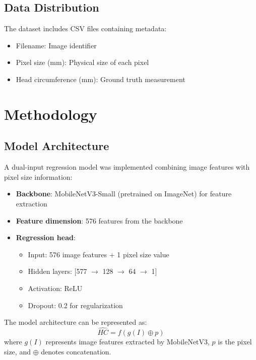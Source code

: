 \documentclass{article}
\begin{document}
\subsection{Data Distribution}
The dataset includes CSV files containing metadata:
\begin{itemize}
    \item Filename: Image identifier
    \item Pixel size (mm): Physical size of each pixel
    \item Head circumference (mm): Ground truth measurement
\end{itemize}

\section{Methodology}
\subsection{Model Architecture}
A dual-input regression model was implemented combining image features with pixel size information:

\begin{itemize}
    \item \textbf{Backbone}: MobileNetV3-Small (pretrained on ImageNet) for feature extraction
    \item \textbf{Feature dimension}: 576 features from the backbone
    \item \textbf{Regression head}: 
    \begin{itemize}
        \item Input: 576 image features + 1 pixel size value
        \item Hidden layers: [577 $\rightarrow$ 128 $\rightarrow$ 64 $\rightarrow$ 1]
        \item Activation: ReLU
        \item Dropout: 0.2 for regularization
    \end{itemize}
\end{itemize}

The model architecture can be represented as:
\begin{equation}
    \hat{HC} = f(g(I) \oplus p)
\end{equation}
where $g(I)$ represents image features extracted by MobileNetV3, $p$ is the pixel size, and $\oplus$ denotes concatenation.
\end{document}
